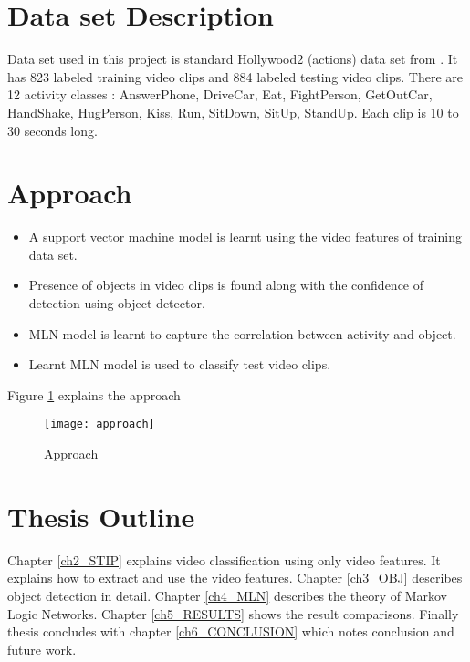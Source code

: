 \section{Data set Description}
Data set used in this project is standard Hollywood2 (actions) data set from \cite{actionsInContext}. 
It has 823 labeled training video clips and 884 labeled testing video clips. 
There are 12 activity classes : AnswerPhone, DriveCar, Eat, FightPerson,
 GetOutCar, HandShake, HugPerson, Kiss, Run, SitDown, SitUp, StandUp.
 Each clip is 10 to 30 seconds long.


\section{Approach}
\begin{itemize}
	\item A support vector machine model is learnt using the video features of training data set. 
	\item Presence of objects in video clips is found along with the confidence of detection using object detector. 
	\item MLN model is learnt to capture the correlation between activity and object.
	\item Learnt MLN model is used to classify test video clips.
\end{itemize}

Figure \ref{fig:approach} explains the approach
\begin{figure}[H]
\begin{center}	
\texttt{[image: approach]} 
\caption{Approach}
\label{fig:approach}
\end{center}
\end{figure}


\section{Thesis Outline}
Chapter \ref{ch2_STIP} explains video classification using only video features. It explains how to extract and use the video features. 
Chapter \ref{ch3_OBJ} describes object detection in detail. 
Chapter \ref{ch4_MLN} describes the theory of Markov Logic Networks. 
Chapter \ref{ch5_RESULTS} shows the result comparisons.
Finally thesis concludes with chapter \ref{ch6_CONCLUSION} which notes conclusion and future work.

\begin{comment}
\begin{table}
\centering
\begin{tabular}{| c | c |}
\hline
{\bf item 1} & {\bf item 2} \\ \hline
%
abcde & 5 \\ \hline
%
pqrst & 4 \\ \hline
\end{tabular}
\caption{A sample table}
\label{table:1}
\end{table}
\end{comment}



